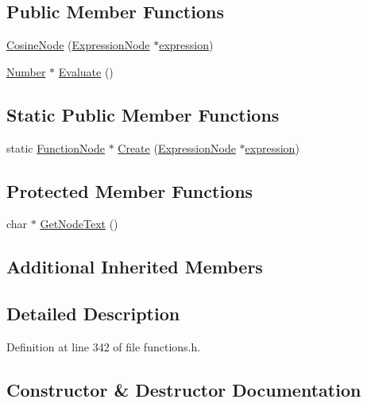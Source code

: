 \subsection*{Public Member Functions}
\begin{DoxyCompactItemize}
\item 
\hyperlink{classCosineNode_aba5e5df8a1d7ddba943df048efd1bf87}{Cosine\+Node} (\hyperlink{classExpressionNode}{Expression\+Node} $\ast$\hyperlink{classFunctionNode_ad7577b179a1937aaf8a0058bb5b546dc}{expression})
\item 
\hyperlink{structNumber}{Number} $\ast$ \hyperlink{classCosineNode_a1dc01c6b70db9882e18d9bf773219447}{Evaluate} ()
\end{DoxyCompactItemize}
\subsection*{Static Public Member Functions}
\begin{DoxyCompactItemize}
\item 
static \hyperlink{classFunctionNode}{Function\+Node} $\ast$ \hyperlink{classCosineNode_ada8e23d238785cb727d3d11d88072bc2}{Create} (\hyperlink{classExpressionNode}{Expression\+Node} $\ast$\hyperlink{classFunctionNode_ad7577b179a1937aaf8a0058bb5b546dc}{expression})
\end{DoxyCompactItemize}
\subsection*{Protected Member Functions}
\begin{DoxyCompactItemize}
\item 
char $\ast$ \hyperlink{classCosineNode_ab57a246c5e637c03af11977c635bc89c}{Get\+Node\+Text} ()
\end{DoxyCompactItemize}
\subsection*{Additional Inherited Members}


\subsection{Detailed Description}


Definition at line 342 of file functions.\+h.



\subsection{Constructor \& Destructor Documentation}

